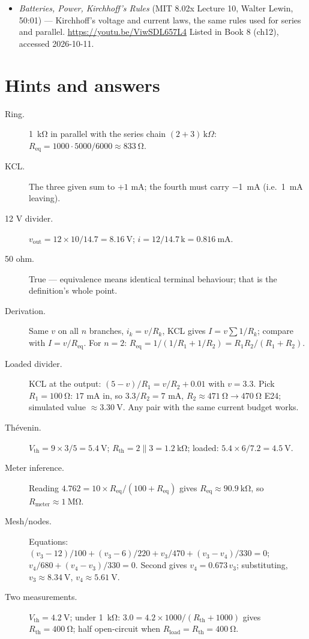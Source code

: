 \begin{rulebox}
\begin{itemize}
\item \emph{Batteries, Power, Kirchhoff's Rules} (MIT 8.02x Lecture 10, Walter Lewin, 50:01) --- Kirchhoff's voltage and current laws, the same rules used for series and parallel. \url{https://youtu.be/ViwSDL657L4} Listed in Book 8 (ch12), accessed 2026-10-11.
\end{itemize}
\end{rulebox}

\section*{Hints and answers}

\begin{description}
\item[Ring.] \qty{1}{\kilo\ohm} in parallel with the series chain
$(2+3)\,\mathrm{k}\Omega$: $R_{\mathrm{eq}}=1000\cdot5000/6000
\approx\qty{833}{\ohm}$.
\item[KCL.] The three given sum to $+1$ mA; the fourth must carry
\qty{-1}{\milli\ampere} (i.e.\ \qty{1}{\milli\ampere} leaving).
\item[12 V divider.] $v_{\mathrm{out}}=12\times10/14.7=\qty{8.16}{\volt}$;
$i=12/14.7\,\mathrm{k}=\qty{0.816}{\milli\ampere}$.
\item[50 ohm.] True — equivalence means identical terminal behaviour; that is
the definition's whole point.
\item[Derivation.] Same $v$ on all $n$ branches, $i_k=v/R_k$, KCL gives
$I=v\sum 1/R_k$; compare with $I=v/R_{\mathrm{eq}}$. For $n=2$:
$R_{\mathrm{eq}}=1/(1/R_1+1/R_2)=R_1R_2/(R_1+R_2)$.
\item[Loaded divider.] KCL at the output: $(5-v)/R_1 = v/R_2 + 0.01$ with
$v=3.3$. Pick $R_1=\qty{100}{\ohm}$: $17$ mA in, so $3.3/R_2=7$ mA,
$R_2\approx\qty{471}{\ohm}\to\qty{470}{\ohm}$ E24; simulated value
$\approx\qty{3.30}{\volt}$. Any pair with the same current budget works.
\item[Th\'evenin.] $V_{\mathrm{th}}=9\times3/5=\qty{5.4}{\volt}$;
$R_{\mathrm{th}}=2\|3=\qty{1.2}{\kilo\ohm}$; loaded:
$5.4\times6/7.2=\qty{4.5}{\volt}$.
\item[Meter inference.] Reading $4.762=10\times R_{\mathrm{eq}}/(100+R_{\mathrm{eq}})$
gives $R_{\mathrm{eq}}\approx\qty{90.9}{\kilo\ohm}$, so
$R_{\mathrm{meter}}\approx\qty{1}{\mega\ohm}$.
\item[Mesh/nodes.] Equations: $(v_3-12)/100+(v_3-6)/220+v_3/470+(v_3-v_4)/330=0$;
$v_4/680+(v_4-v_3)/330=0$. Second gives $v_4=0.673\,v_3$; substituting,
$v_3\approx\qty{8.34}{\volt}$, $v_4\approx\qty{5.61}{\volt}$.
\item[Two measurements.] $V_{\mathrm{th}}=\qty{4.2}{\volt}$; under
\qty{1}{\kilo\ohm}: $3.0=4.2\times1000/(R_{\mathrm{th}}+1000)$ gives
$R_{\mathrm{th}}=\qty{400}{\ohm}$; half open-circuit when
$R_{\mathrm{load}}=R_{\mathrm{th}}=\qty{400}{\ohm}$.
\end{description}


